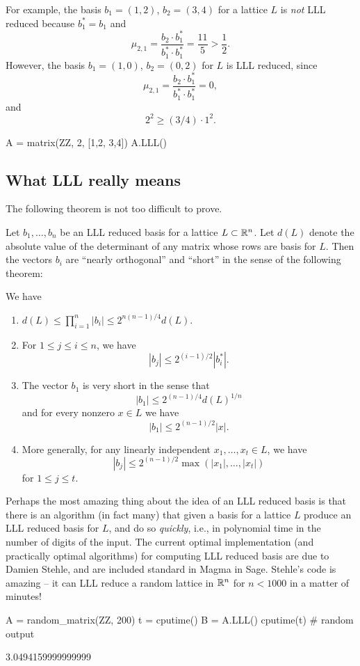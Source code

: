 For example, the basis $b_1 = (1,2)$, $b_2 = (3,4)$ for a lattice $L$
 is {\em not}
LLL reduced because $b_1^*=b_1$ and 
$$
   \mu_{2,1} = \frac{b_2 \cdot b_1^*}{b_1^* \cdot b_1^*}
       = \frac{11}{5} > \frac{1}{2}.
$$
However, the basis $b_1 = (1,0)$, $b_2 = (0,2)$ for $L$ is
LLL reduced, since
$$
 \mu_{2,1} = \frac{b_2 \cdot b_1^*}{b_1^* \cdot b_1^*}
       = 0,
$$
and
$$
   2^2 \geq (3/4) \cdot 1^2.
$$
\begin{sagecode}
\begin{sagecell}
A = matrix(ZZ, 2, [1,2, 3,4])
A.LLL()
\end{sagecell}
\begin{sageout}
[1 0]
[0 2]
\end{sageout}
\end{sagecode}

\subsection{What LLL really means}
The following theorem is not too difficult to prove.

Let $b_1, \ldots, b_n$ be an LLL reduced basis
for a lattice $L\subset \mathbb{R}^n$.  Let $d(L)$ denote
the absolute value of the determinant of any matrix
whose rows are basis for $L$.   Then the vectors
$b_i$ are ``nearly orthogonal'' and ``short'' in 
the sense of the following theorem:
\begin{theorem}
We have
\begin{enumerate}
\item $d(L) \leq \prod_{i=1}^n |b_i| \leq 2^{n(n-1)/4} d(L)$.
\item For $1\leq j \leq i \leq n$, we have
$$
 |b_j| \leq 2^{(i-1)/2} |b_i^*|.
$$
\item The vector $b_1$ is very short in the sense that
$$
  |b_1| \leq 2^{(n-1)/4} d(L)^{1/n}
$$
and for every nonzero $x \in L$ we have
$$
  |b_1| \leq 2^{(n-1)/2} |x|.
$$
\item More generally, for any linearly independent $x_1,\ldots, x_t \in L$, we have 
$$
  |b_j| \leq 2^{(n-1)/2} \max(|x_1|, \ldots, |x_t|)
$$
for $1\leq j \leq t$. 
\end{enumerate}
\end{theorem}

Perhaps the most amazing thing about the idea of an LLL
reduced basis is that there is an algorithm (in fact many)
that given a basis for a lattice $L$ produce an LLL reduced
basis for $L$, and do so {\em quickly}, i.e., in polynomial
time in the number of digits of the input.   The current
optimal implementation (and practically optimal algorithms)
for computing LLL reduced basis are due to Damien Stehle,
and are included standard in Magma in Sage.   Stehle's code
is amazing -- it can LLL reduce a random lattice in $\mathbb{R}^{n}$
for $n<1000$ in a matter of minutes!
\begin{sagecode}
\begin{sagecell}
A = random_matrix(ZZ, 200)
t = cputime()
B = A.LLL()     
cputime(t)     # random output
\end{sagecell}
\begin{sageout}
3.0494159999999999
\end{sageout}
\end{sagecode}

